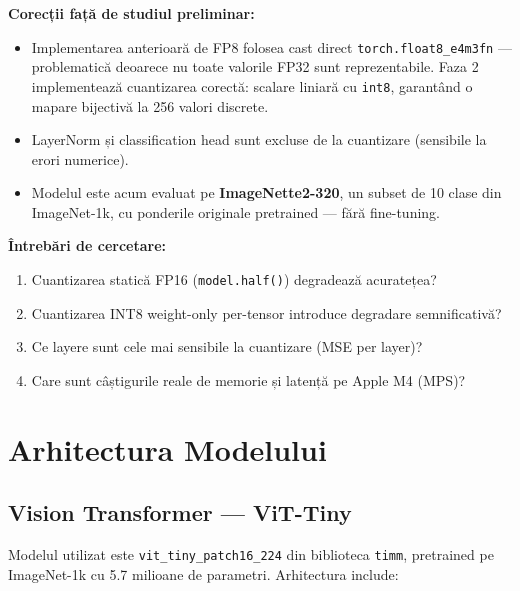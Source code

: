 \documentclass[12pt,a4paper]{article}
\begin{document}
\textbf{Corecții față de studiul preliminar:}
\begin{itemize}
  \item Implementarea anterioară de FP8 folosea cast direct \texttt{torch.float8\_e4m3fn}
    — problematică deoarece nu toate valorile FP32 sunt reprezentabile. Faza 2
    implementează cuantizarea corectă: scalare liniară cu \texttt{int8}, garantând
    o mapare bijectivă la 256 valori discrete.
  \item LayerNorm și classification head sunt excluse de la cuantizare (sensibile la
    erori numerice).
  \item Modelul este acum evaluat pe \textbf{ImageNette2-320}, un subset de 10 clase
    din ImageNet-1k, cu ponderile originale pretrained — fără fine-tuning.
\end{itemize}

\textbf{Întrebări de cercetare:}
\begin{enumerate}
  \item Cuantizarea statică FP16 (\texttt{model.half()}) degradează acuratețea?
  \item Cuantizarea INT8 weight-only per-tensor introduce degradare semnificativă?
  \item Ce layere sunt cele mai sensibile la cuantizare (MSE per layer)?
  \item Care sunt câștigurile reale de memorie și latență pe Apple M4 (MPS)?
\end{enumerate}

\section{Arhitectura Modelului}

\subsection{Vision Transformer — ViT-Tiny}

Modelul utilizat este \texttt{vit\_tiny\_patch16\_224} din biblioteca \texttt{timm},
pretrained pe ImageNet-1k cu 5.7 milioane de parametri. Arhitectura include:
\end{document}
